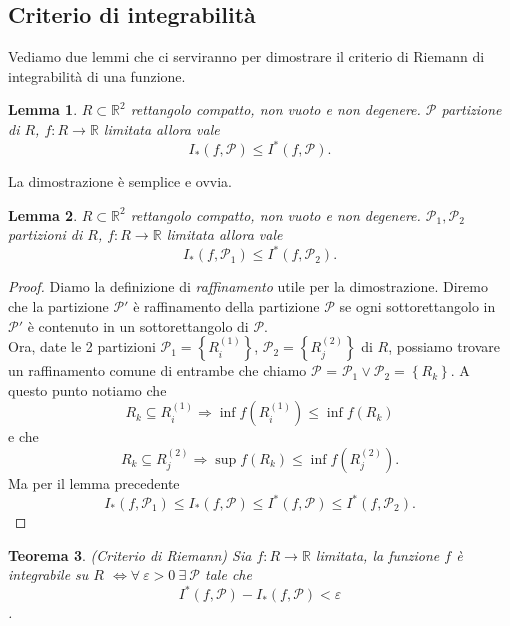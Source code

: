 \documentclass[10pt]{article}
\theoremstyle{plain}
\newtheorem{thm}{Teorema}[section]
\newtheorem{lem}[thm]{Lemma}
\theoremstyle{definition}
\begin{document}
 \subsection{Criterio di integrabilità}
 Vediamo due lemmi che ci serviranno per dimostrare il criterio di Riemann di integrabilità di una funzione.
\begin{lem}
 $R\subset \mathbb{R}^2$ rettangolo compatto, non vuoto e non degenere. $\mathcal{P}$ partizione di $R$, $f:R\to \mathbb{R}$ limitata allora vale $$I_*(f,\mathcal{P})\leq I^*(f,\mathcal{P}).$$
\end{lem}
La dimostrazione è semplice e ovvia.
\begin{lem}
 $R\subset \mathbb{R}^2$ rettangolo compatto, non vuoto e non degenere. $\mathcal{P}_1, \mathcal{P}_2$ partizioni di $R$, $f:R\to \mathbb{R}$ limitata allora vale $$I_*(f,\mathcal{P}_1)\leq I^*(f,\mathcal{P}_2).$$
 \label{lem: somme sup somme inf}
\end{lem}
\begin{proof}
Diamo la definizione di \textit{raffinamento} utile per la dimostrazione.
Diremo che la partizione $\mathcal{P}'$ è raffinamento della partizione $\mathcal{P}$ se ogni sottorettangolo in  $\mathcal{P}'$ è contenuto in un sottorettangolo di $\mathcal{P}$. 
\\ Ora, date le 2 partizioni $\mathcal{P}_1 = \left \{R_i^{(1)} \right \}$,  $\mathcal{P}_2 =  \left \{R_j^{(2)} \right \}$ di $R$, possiamo trovare un raffinamento comune di entrambe che chiamo $\mathcal{P}$ =  $\mathcal{P}_1 \vee  \mathcal{P}_2 =  \left \{R_k \right \}$. A questo punto notiamo che $$R_k\subseteq R_i^{(1)}\Rightarrow \inf f(R_i^{(1)})\leq \inf f(R_k) $$
 e che
 $$R_k\subseteq R_j^{(2)}\Rightarrow \sup f(R_k)\leq \inf f(R_j^{(2)}). $$
 Ma per il lemma precedente $$I_*(f,\mathcal{P}_1)\leq I_*(f,\mathcal{P})\leq I^*(f,\mathcal{P}) \leq I^*(f,\mathcal{P}_2).$$
\end{proof} 
\begin{thm} (Criterio di Riemann) Sia $f:R\to \mathbb{R}$ limitata, la funzione $f$ è integrabile su $R$ $\Leftrightarrow \forall \ \varepsilon \! \! >\! \! 0\ \exists \ \mathcal{P}$ tale che $$I^*(f,\mathcal{P})-I_*(f,\mathcal{P})<\varepsilon$$.
  \end{thm}
\end{document}
